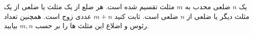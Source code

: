 \exercise
یک
$n$
 ضلعی محدب به
$m$
مثلث تقسیم شده است. هر ضلع از یک مثلث یا ضلعی از یک مثلث دیگر یا ضلعی از
$n$
ضلعی است. ثابت کنید
$m + n$
عددی زوج است. همچنین تعداد رئوس و اضلاع این مثلث ها را بر حسب
$m, n$
بیابید.